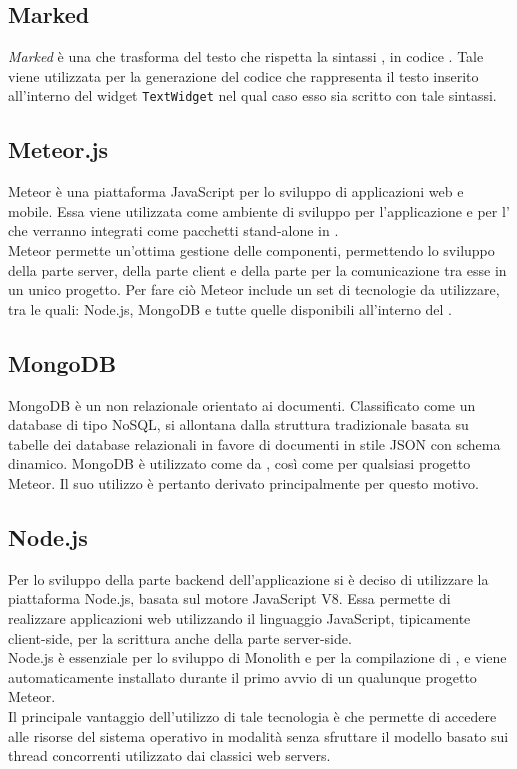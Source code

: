 \subsection{Marked}
\textit{Marked} è una   che trasforma del testo che rispetta la sintassi , in codice . Tale  viene utilizzata per la generazione del codice  che rappresenta il testo inserito all'interno del widget \texttt{TextWidget} nel qual caso esso sia scritto con tale sintassi. 

\subsection{Meteor.js}
Meteor è una piattaforma JavaScript per lo sviluppo di applicazioni web e mobile. Essa viene utilizzata come ambiente di sviluppo per l'applicazione e per l' che verranno integrati come pacchetti stand-alone in . \\
Meteor permette un'ottima gestione delle componenti, permettendo lo sviluppo della parte server, della parte client e della parte per la comunicazione tra esse in un unico progetto. Per fare ciò Meteor include un set di tecnologie da utilizzare, tra le quali: Node.js, MongoDB e tutte quelle disponibili all'interno del  .

\subsection{MongoDB}
MongoDB è un  non relazionale orientato ai documenti. Classificato come un database di tipo NoSQL, si allontana dalla struttura tradizionale basata su tabelle dei database relazionali in favore di documenti in stile JSON con schema dinamico. MongoDB è utilizzato come  da , così come per qualsiasi progetto Meteor. Il suo utilizzo è pertanto derivato principalmente per questo motivo.

\subsection{Node.js}
Per lo sviluppo della parte backend dell'applicazione si è deciso di utilizzare la piattaforma  Node.js, basata sul motore JavaScript V8. Essa permette di realizzare applicazioni web utilizzando il linguaggio JavaScript, tipicamente client-side, per la scrittura anche della parte server-side. \\
Node.js è essenziale per lo sviluppo di Monolith e per la compilazione di , e viene automaticamente installato durante il primo avvio di un qualunque progetto Meteor. \\
Il principale vantaggio dell'utilizzo di tale tecnologia è che permette di accedere alle risorse del sistema operativo in modalità  senza sfruttare il modello basato sui thread concorrenti utilizzato dai classici web servers.

